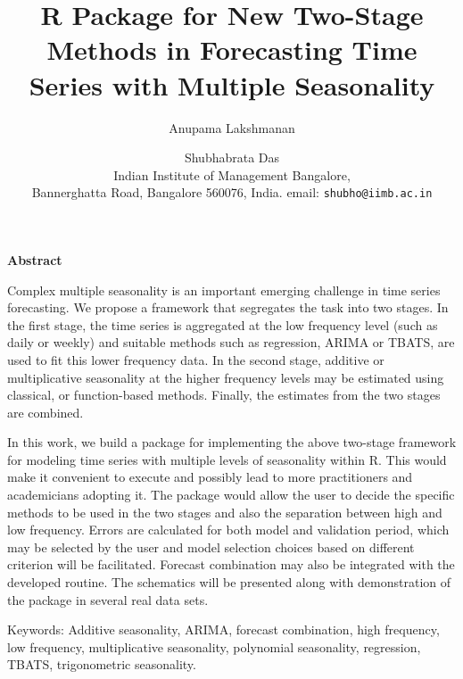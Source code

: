 \documentclass[11pt]{article}
\begin{document}
\title{R Package for New Two-Stage Methods in Forecasting Time Series with Multiple Seasonality}

\author{
Anupama Lakshmanan \and
Shubhabrata Das\\ Indian Institute of Management Bangalore, \\
Bannerghatta Road, Bangalore 560076, India.  email: \texttt{shubho@iimb.ac.in}
}
\date{\empty}
\maketitle


\begin{center}
\textbf{Abstract}
\end{center}
	
Complex multiple seasonality is an important emerging challenge in time series forecasting. We propose a framework that segregates the task into two stages. In the first stage, the time series is aggregated at the low frequency level (such as daily or weekly) and suitable methods such as regression, ARIMA or TBATS, are used to fit this lower frequency data. In the second stage, additive or multiplicative seasonality at the higher frequency levels may be estimated using classical, or function-based methods. Finally, the estimates from the two stages are combined.

In this work, we build a package for implementing the above two-stage framework for modeling time series with multiple levels of seasonality within R. This would make it convenient to execute and possibly lead to more practitioners and academicians adopting it. The package would allow the user to decide the specific methods to be used in the two stages and also the separation between high and low frequency. Errors are calculated for both model and validation period, which may be selected by the user and model selection choices based on different criterion will be facilitated. Forecast combination may also be integrated with the developed routine. The schematics will be presented along with demonstration of the package in several real data sets.



\vspace{0.1in}
\noindent
Keywords: Additive seasonality, ARIMA, forecast combination, high frequency, low frequency, multiplicative seasonality, polynomial seasonality, regression, TBATS, trigonometric seasonality. 
\end{document}
